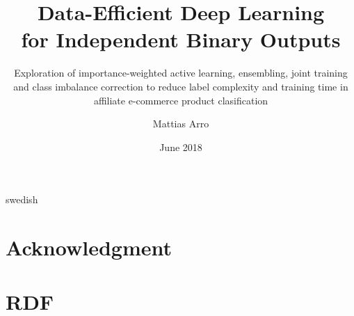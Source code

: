 \documentclass[a4paper,11pt]{kth-mag}
\title{
      Data-Efficient Deep Learning
      \\for Independent Binary Outputs
    }
\subtitle{
      Exploration of importance-weighted active learning, ensembling,
      joint training and class imbalance correction to reduce label complexity
      and training time in affiliate e-commerce product clasification
    }
\author{Mattias Arro}
\date{June 2018}
\begin{document}
\frontmatter


\removepagenumbers
\maketitle
{}

\begin{abstract}

\end{abstract}
\clearpage

\begin{foreignabstract}{swedish}

\end{foreignabstract}
\clearpage

\chapter*{Acknowledgment}


\clearpage
\tableofcontents*

\mainmatter
%

\newpage


\pagestyle{newchap}






\renewcommand\bibname{References}





\appendix
\addappheadtotoc
\chapter{RDF}\label{appA}

\end{document}
